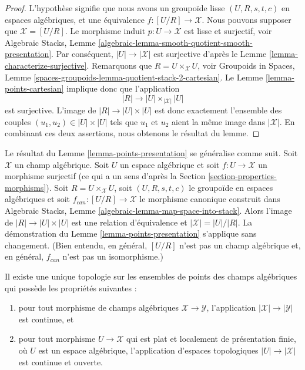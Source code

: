 \begin{proof}
L'hypothèse signifie que nous avons un groupoïde lisse $(U, R, s, t, c)$
en espaces algébriques, et une équivalence $f : [U/R] \to \mathcal{X}$.
Nous pouvons supposer que $\mathcal{X} = [U/R]$.
Le morphisme induit $p : U \to \mathcal{X}$ est lisse et surjectif, voir
Algebraic Stacks,
Lemme \ref{algebraic-lemma-smooth-quotient-smooth-presentation}.
Par conséquent, $|U| \to |\mathcal{X}|$ est surjective d'après le
Lemme \ref{lemma-characterize-surjective}.
Remarquons que $R = U \times_\mathcal{X} U$, voir
Groupoids in Spaces,
Lemme \ref{spaces-groupoids-lemma-quotient-stack-2-cartesian}.
Le
Lemme \ref{lemma-points-cartesian}
implique donc que l'application
$$
|R| \longrightarrow |U| \times_{|\mathcal{X}|} |U|
$$
est surjective. L'image de $|R| \to |U| \times |U|$ est donc
exactement l'ensemble des couples $(u_1, u_2) \in |U| \times |U|$
tels que $u_1$ et $u_2$ aient la même image dans $|\mathcal{X}|$.
En combinant ces deux assertions, nous obtenons le résultat du lemme.
\end{proof}

\begin{remark}
\label{remark-more-general-presentation}
Le résultat du
Lemme \ref{lemma-points-presentation}
se généralise comme suit.
Soit $\mathcal{X}$ un champ algébrique.
Soit $U$ un espace algébrique et soit $f : U \to \mathcal{X}$ un morphisme surjectif
(ce qui a un sens d'après la
Section \ref{section-properties-morphisms}).
Soit $R = U \times_\mathcal{X} U$, soit $(U, R, s, t, c)$ le groupoïde
en espaces algébriques et soit $f_{can} : [U/R] \to \mathcal{X}$ le
morphisme canonique construit dans
Algebraic Stacks, Lemme \ref{algebraic-lemma-map-space-into-stack}.
Alors l'image de $|R| \to |U| \times |U|$ est une relation d'équivalence
et $|\mathcal{X}| = |U|/|R|$. La démonstration du
Lemme \ref{lemma-points-presentation}
s'applique sans changement. (Bien entendu, en général, $[U/R]$ n'est pas un champ
algébrique et, en général, $f_{can}$ n'est pas un isomorphisme.)
\end{remark}

\begin{lemma}
\label{lemma-topology-points}
Il existe une unique topologie sur les ensembles de points
des champs algébriques qui possède les propriétés suivantes :
\begin{enumerate}
\item pour tout morphisme de champs algébriques $\mathcal{X} \to \mathcal{Y}$,
l'application $|\mathcal{X}| \to |\mathcal{Y}|$ est continue, et
\item pour tout morphisme $U \to \mathcal{X}$ qui est plat et localement
de présentation finie, où $U$ est un espace algébrique,
l'application d'espaces topologiques $|U| \to |\mathcal{X}|$ est continue et ouverte.
\end{enumerate}
\end{lemma}

